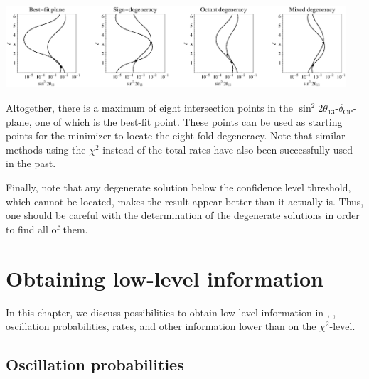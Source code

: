 \begin{description}
\begin{center}
\includegraphics[width=0.95\textwidth]{ircurves}
\end{center}
 Altogether, there is a maximum of eight intersection points in the $\sin^2 2 \theta_{13}$-$\delta_{\mathrm{CP}}$-plane, one of which is the best-fit point. These points can be used as starting points for the minimizer to locate the eight-fold degeneracy. Note that similar methods using the $\chi^2$ instead of the total rates have also been successfully used in the past. 
\end{description}
Finally, note that any degenerate solution below the confidence level threshold, which cannot be located, makes the result appear better than it actually is. Thus, one should be careful with the determination of the degenerate solutions in order to find all of them.


\chapter{Obtaining low-level information}

In this chapter, we discuss possibilities to obtain low-level information
in \GLOBES , \ie, oscillation probabilities, rates, and other
information lower than on the $\chi^2$-level.

\section{Oscillation probabilities}

